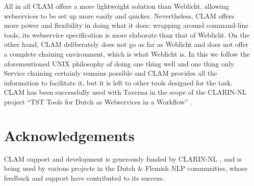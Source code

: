 \documentclass[11pt]{article}
\begin{document}
All in all CLAM offers a more lightweight solution than Weblicht, allowing
webservices to be set up more easily and quicker. Nevertheless, CLAM offers
more power and flexibility in doing what it does: wrapping around command-line
tools, its webservice specification is more elaborate than that of Weblicht. On
the other hand, CLAM deliberately does not go as far as Weblicht and does not
offer a complete chaining environment, which is what Weblicht is. In this we
follow the aforementioned UNIX philosophy of doing one thing well and one thing
only. Service chaining certainly remains possible and CLAM provides all the
information to facilitate it, but it is left to other tools designed for the
task. CLAM has been successfully used with Taverna \cite{TAVERNA} in the scope
of the CLARIN-NL project ``TST Tools for Dutch as Webservices in a Workflow''
\cite{KEMPSSNIJDERS2012}. 

\section*{Acknowledgements}

CLAM support and development is generously funded by CLARIN-NL \cite{CLARIN}, and is being
used by various projects in the Dutch \& Flemish NLP communities, whose feedback
and support have contributed to its success. 



\end{document}
